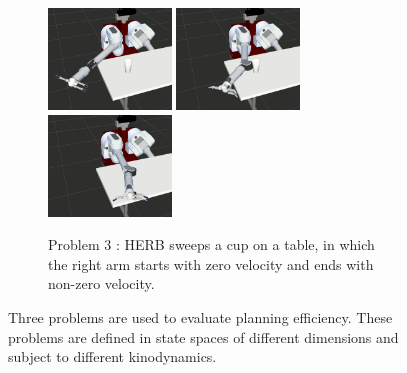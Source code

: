 \documentclass[letterpaper, 10 pt, conference]{ieeeconf}  %
\begin{document}
\begin{figure}[t!]
\begin{subfigure}[b]{\textwidth}
    \includegraphics[height=2.7cm]{fig/planning_efficiency/herb_batting_3}
    \includegraphics[height=2.7cm]{fig/planning_efficiency/herb_batting_4}
    \includegraphics[height=2.7cm]{fig/planning_efficiency/herb_batting_5}
	\caption{Problem 3 : HERB sweeps a cup on a table, in which the right arm starts with zero velocity and ends with non-zero velocity.}
	\label{fig:planning_efficiency:herb:example}
	\end{subfigure}
	\caption{\captionstyle Three problems are used to evaluate planning efficiency.
	These problems are defined in state spaces of different dimensions and subject to different kinodynamics.}
	\label{fig:problems}
\end{figure} 
\end{document}
